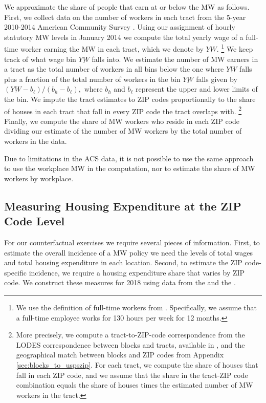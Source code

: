 We approximate the share of people that earn at or below the MW as follows.
First, we collect data on the number of workers in each tract from the 5-year 
2010-2014 American Community Survey \parencite{CensusACS}.
Using our assignment of hourly statutory MW levels in January 2014 we compute 
the total yearly wage of a full-time worker earning the MW in each tract, which 
we denote by $\underline{YW}$.%
\footnote{We use the definition of full-time workers from \textcite{IRSfulltime}.
Specifically, we assume that a full-time employee works for 130 hours per week
for 12 months.}
We keep track of what wage bin $\underline{YW}$ falls into.
We estimate the number of MW earners in a tract as the total number of workers 
in all bins below the one where $\underline{YW}$ falls plus a fraction of the 
total number of workers in the bin $\underline{YW}$ falls given by 
$\left(\underline{YW} - b_\ell\right)/\left(b_h - b_\ell\right),$
where $b_h$ and $b_\ell$ represent the upper and lower limits of 
the bin.
We impute the tract estimates to ZIP codes proportionally to the share of 
houses in each tract that fall in every ZIP code the tract overlaps with.%
\footnote{More precisely, we compute a tract-to-ZIP-code correspondence from
the LODES correspondence between blocks and tracts, available in 
\textcite{CensusLODES}, and the geographical match between blocks and ZIP codes
from Appendix \ref{sec:blocks_to_uspszip}.
For each tract, we compute the share of houses that fall in each ZIP code, and 
we assume that the share in the tract-ZIP code combination equals the share of
houses times the estimated number of MW workers in the tract.}
Finally, we compute the share of MW workers who reside in each ZIP 
code dividing our estimate of the number of MW workers by the total
number of workers in the data.

Due to limitations in the ACS data, it is not possible to use the same approach 
to use the workplace MW in the computation, nor to estimate the share of MW 
workers by workplace.

\subsection{Measuring Housing Expenditure at the ZIP Code Level}
\label{sec:measure_housing_expenditure}

For our counterfactual exercises we require several pieces of information.
First, to estimate the overall incidence of a MW policy we need the levels 
of total wages and total housing expenditure in each location.
Second, to estimate the ZIP code-specific incidence, we require a housing 
expenditure share that varies by ZIP code.
We construct these measures for 2018 using data from the \textcite{IRS} and
the \textcite{hudSAFMR}.

